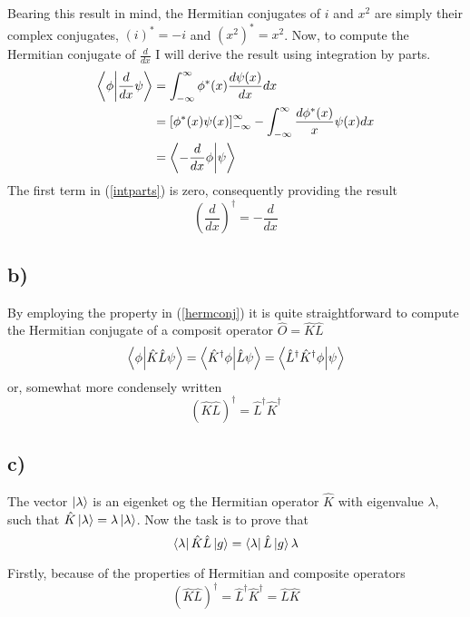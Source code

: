 \documentclass{article}
\begin{document}
Bearing this result in mind, the Hermitian conjugates of $i$ and $x^2$ are simply their complex conjugates, $(i)^*=-i$ and $(x^2)^*=x^2$. Now, to compute the Hermitian conjugate of $\frac{d}{dx}$ I will derive the result using integration by parts.
\begin{align}
\braket{\phi}{\frac{d}{dx}\psi}&=\int_{-\infty}^{\infty}\phi^*(x)\frac{d\psi(x)}{dx} dx\\
&=\left[\phi^*(x)\psi(x)\right]_{-\infty}^{\infty}
-\int_{-\infty}^{\infty}\frac{d\phi^*(x)}{x}\psi(x) dx \label{intparts}\\
&= \braket{-\frac{d}{dx}\phi}{\psi}
\end{align}
The first term in (\ref{intparts}) is zero, consequently providing the result
\begin{equation}
\left(\frac{d}{dx} \right)^{\dagger} = -\frac{d}{dx}
\end{equation}

\subsection*{b)}
By employing the property in (\ref{hermconj}) it is quite straightforward to compute the Hermitian conjugate of a composit operator $\hat{O}=\hat{K}\hat{L}$
\begin{equation}
\braket{\phi}{\hat{K}\hat{L}\psi}=\braket{\hat{K}^{\dagger}\phi}{\hat{L}\psi}=\braket{\hat{L}^{\dagger}\hat{K}^{\dagger}\phi}{\psi}
\end{equation}
or, somewhat more condensely written
\begin{equation}
(\hat{K}\hat{L})^{\dagger}=\hat{L}^{\dagger}\hat{K}^{\dagger}
\end{equation}

\subsection*{c)}

The vector $\ket{\lambda}$ is an eigenket og the Hermitian operator $\hat{K}$ with eigenvalue $\lambda$, such that $\hat{K}\ket{\lambda}=\lambda\ket{\lambda}$. Now the task is to prove that
\begin{equation}
\bra{\lambda}\hat{K}\hat{L}\ket{g}=\bra{\lambda}\hat{L}\ket{g}\lambda
\end{equation}

Firstly, because of the properties of Hermitian and composite operators
\begin{equation}
(\hat{K}\hat{L})^{\dagger}=\hat{L}^{\dagger}\hat{K}^{\dagger}=\hat{L}\hat{K}
\end{equation}
\end{document}
